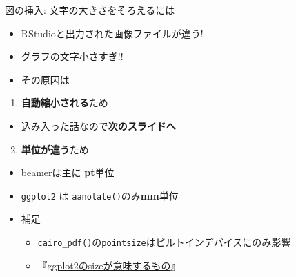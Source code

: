 \documentclass[
  12pt,
  ignorenonframetext,
]{beamer}
\providecommand{\tightlist}{%
  \setlength{\itemsep}{0pt}\setlength{\parskip}{0pt}}
\begin{document}
\begin{frame}[fragile]{図の挿入: 文字の大きさをそろえるには}
\protect\hypertarget{ux56f3ux306eux633fux5165-ux6587ux5b57ux306eux5927ux304dux3055ux3092ux305dux308dux3048ux308bux306bux306f}{}

\begin{itemize}
\tightlist
\item
  RStudioと出力された画像ファイルが違う!
\item
  グラフの文字小さすぎ!!
\item
  その原因は
\end{itemize}

\begin{enumerate}
\tightlist
\item
  \textbf{自動縮小される}ため
\end{enumerate}

\begin{itemize}
\tightlist
\item
  込み入った話なので\textbf{次のスライドへ}
\end{itemize}

\begin{enumerate}
\setcounter{enumi}{1}
\tightlist
\item
  \textbf{単位が違う}ため
\end{enumerate}

\begin{itemize}
\tightlist
\item
  beamerは主に \textbf{pt}単位
\item
  \texttt{ggplot2} は \texttt{aanotate()}のみ\textbf{mm}単位
\item
  補足

  \begin{itemize}
  \tightlist
  \item
    \texttt{cairo\_pdf()}の\texttt{pointsize}はビルトインデバイスにのみ影響
  \item
    『\href{https://uribo.hatenablog.com/entry/2018/06/11/232041}{ggplot2のsizeが意味するもの}』
  \end{itemize}
\end{itemize}

\end{frame}
\end{document}
